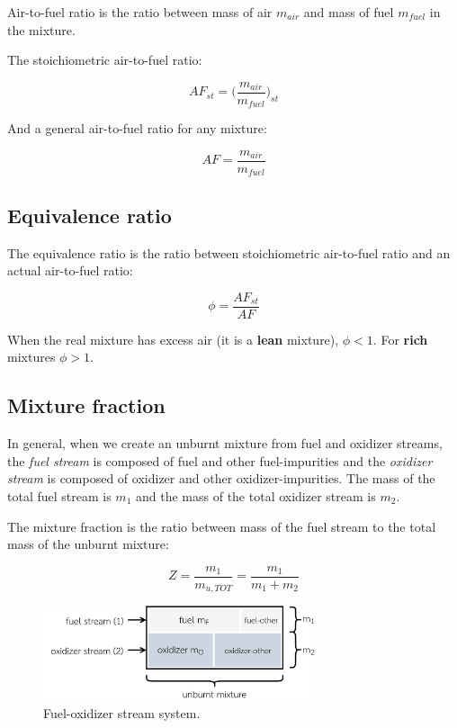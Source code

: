 \documentclass[10pt,twocolumn]{article}
\begin{document}
Air-to-fuel ratio is the ratio between mass of air $m_{air}$ and mass of fuel $m_{fuel}$ in the mixture.

The stoichiometric air-to-fuel ratio:

\begin{equation}
AF_{st} = \Big( \frac{m_{air}}{m_{fuel}} \Big)_{st}
\end{equation}

And a general air-to-fuel ratio for any mixture:

\begin{equation}
AF = \frac{m_{air}}{m_{fuel}}
\end{equation}

\subsection{Equivalence ratio}

The equivalence ratio is the ratio between stoichiometric air-to-fuel ratio and an actual air-to-fuel ratio:

\begin{equation}
\phi = \frac{AF_{st}}{AF}
\end{equation}

When the real mixture has excess air (it is a \textbf{lean} mixture), $\phi < 1$. For \textbf{rich} mixtures $\phi > 1$.





\subsection{Mixture fraction}

In general, when we create an unburnt mixture from fuel and oxidizer streams, the \textit{fuel stream} is composed of fuel and other fuel-impurities and the \textit{oxidizer stream} is composed of oxidizer and other oxidizer-impurities. The mass of the total fuel stream is $m_1$ and the mass of the total oxidizer stream is $m_2$.

The mixture fraction is the ratio between mass of the fuel stream to the total mass of the unburnt mixture:

\begin{equation}
Z = \frac{m_1}{m_{u, TOT}} = \frac{m_1}{m_1 + m_2}
\end{equation}

\begin{figure}[H]
\centering\includegraphics[width=8cm]{mixture-fraction.png}
\caption{Fuel-oxidizer stream system.}			
\label{fig:mixture-fraction}
\end{figure}
\end{document}

